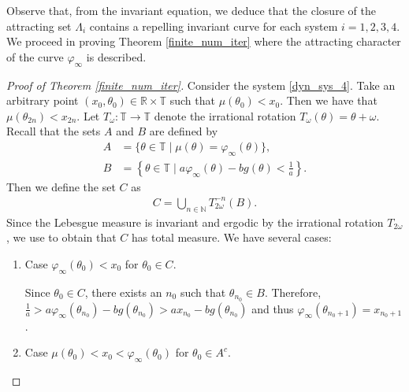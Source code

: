 \documentclass[12pt]{article}
\newcommand{\N}{\mathbb{N}}
\newcommand{\T}{\mathbb{T}}
\newcommand{\R}{\mathbb{R}}
\theoremstyle{plain}
\theoremstyle{remark}
\theoremstyle{definition}
\begin{document}
Observe that, from the invariant equation, we deduce that the closure of the attracting set $\Lambda_i$ contains a repelling invariant curve for each system $i=1,2,3,4$.
We proceed in proving Theorem \ref{finite_num_iter} where the attracting character of the curve $\varphi_\infty$ is described.
\begin{proof}[Proof of Theorem \ref{finite_num_iter}]
    Consider the system \eqref{dyn_sys_4}.
    Take an arbitrary point $(x_0,\theta_0)\in\R\times\T$ such that $\mu(\theta_0)<x_0$. Then we have that $\mu(\theta_{2n})<x_{2n}$. Let $T_\omega\colon\T\to\T$ denote the irrational rotation $T_\omega(\theta)=\theta+\omega$. Recall that the sets $A$ and $B$ are defined by
    \begin{align*}
        A &= \{\theta\in\T\mid\mu(\theta)=\varphi_\infty(\theta)\},\\
        B &= \left\{\theta\in\T\mid a\varphi_\infty(\theta)-b g(\theta)<\frac{1}{a}\right\}.
    \end{align*}
    Then we define the set $C$ as
    \begin{align*}
        C = \bigcup_{n\in\N} T_{2\omega}^{-n}(B).
    \end{align*}
    Since the Lebesgue measure is invariant and ergodic by the irrational rotation $T_{2\omega}$, we use \cite[Theorem 1.5]{walters2000introduction} to obtain that $C$ has total measure. We have several cases:
    \begin{enumerate}
        \item Case $\varphi_\infty(\theta_0)< x_0$ for $\theta_0\in C$.

        Since $\theta_0\in C$, there exists an $n_0$ such that $\theta_{n_0}\in B$. Therefore, $\frac{1}{a}>a\varphi_\infty(\theta_{n_0})-b g(\theta_{n_0})>ax_{n_0}-b g(\theta_{n_0})$ and thus $\varphi_\infty(\theta_{n_0+1})= x_{n_0+1}$.

        \item Case $\mu(\theta_0)<x_0<\varphi_\infty(\theta_0)$ for $\theta_0\in A^c$.


\end{enumerate}
\end{proof}
\end{document}
